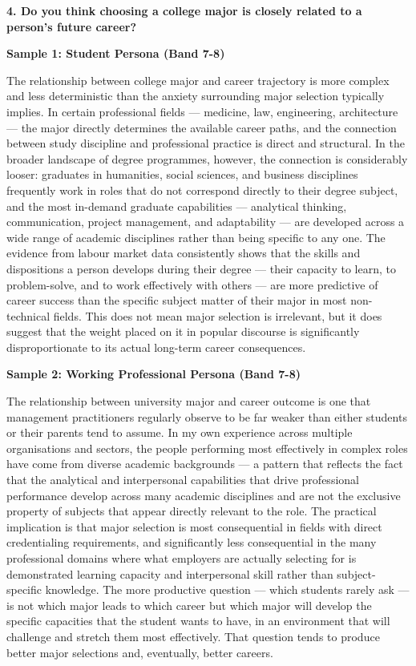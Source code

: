 \separator

\begin{ieltsquestion}
\textbf{4. Do you think choosing a college major is closely related to a person's future career?}
\end{ieltsquestion}
\textbf{Sample 1: Student Persona (Band 7-8)}

The relationship between college major and career trajectory is more complex and less deterministic than the anxiety surrounding major selection typically implies. In certain professional fields — medicine, law, engineering, architecture — the major directly determines the available career paths, and the connection between study discipline and professional practice is direct and structural. In the broader landscape of degree programmes, however, the connection is considerably looser: graduates in humanities, social sciences, and business disciplines frequently work in roles that do not correspond directly to their degree subject, and the most in-demand graduate capabilities — analytical thinking, communication, project management, and adaptability — are developed across a wide range of academic disciplines rather than being specific to any one. The evidence from labour market data consistently shows that the skills and dispositions a person develops during their degree — their capacity to learn, to problem-solve, and to work effectively with others — are more predictive of career success than the specific subject matter of their major in most non-technical fields. This does not mean major selection is irrelevant, but it does suggest that the weight placed on it in popular discourse is significantly disproportionate to its actual long-term career consequences.

\textbf{Sample 2: Working Professional Persona (Band 7-8)}

The relationship between university major and career outcome is one that management practitioners regularly observe to be far weaker than either students or their parents tend to assume. In my own experience across multiple organisations and sectors, the people performing most effectively in complex roles have come from diverse academic backgrounds — a pattern that reflects the fact that the analytical and interpersonal capabilities that drive professional performance develop across many academic disciplines and are not the exclusive property of subjects that appear directly relevant to the role. The practical implication is that major selection is most consequential in fields with direct credentialing requirements, and significantly less consequential in the many professional domains where what employers are actually selecting for is demonstrated learning capacity and interpersonal skill rather than subject-specific knowledge. The more productive question — which students rarely ask — is not which major leads to which career but which major will develop the specific capacities that the student wants to have, in an environment that will challenge and stretch them most effectively. That question tends to produce better major selections and, eventually, better careers.

